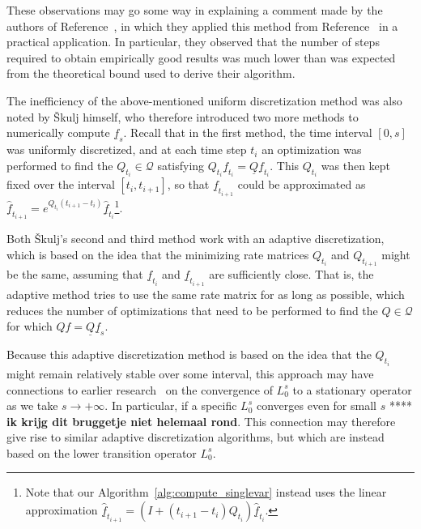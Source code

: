 \documentclass[10pt,a4paper]{paper}
\theoremstyle{definition}
\newcommand{\rateset}{\mathcal{Q}}
\newcommand{\lrate}{\underline{Q}}
\begin{document}
These observations may go some way in explaining a comment made by the authors of Reference~\cite{troffaes2015using}, in which they applied this method from Reference~\cite{Skulj:2015cq} in a practical application. In particular, they observed that the number of steps required to obtain empirically good results was much lower than was expected from the theoretical bound used to derive their algorithm.

The inefficiency of the above-mentioned uniform discretization method was also noted by {\v{S}}kulj himself, who therefore introduced two more methods to numerically compute $\underline{f}_s$. Recall that in the first method, the time interval $[0,s]$ was uniformly discretized, and at each time step $t_i$ an optimization was performed to find the $Q_{t_i}\in\rateset$ satisfying $Q_{t_i}\underline{f}_{t_i}=\lrate \underline{f}_{t_i}$. This $Q_{t_i}$ was then kept fixed over the interval $[t_i,t_{i+1}]$, so that $\underline{f}_{t_{i+1}}$ could be approximated as $\underline{\hat{f}}_{t_{i+1}} = e^{Q_{t_i}(t_{i+1}-t_i)}\underline{\hat{f}}_{t_{i}}$\footnote{Note that our Algorithm~\ref{alg:compute_singlevar} instead uses the linear approximation $\underline{\hat{f}}_{t_{i+1}} = \left(I+(t_{i+1}-t_i)Q_{t_i}\right)\underline{\hat{f}}_{t_{i}}$.}. 

Both {\v{S}}kulj's second and third method work with an adaptive discretization, which is based on the idea that the minimizing rate matrices $Q_{t_i}$ and $Q_{t_{i+1}}$ might be the same, assuming that $\underline{f}_{t_{i}}$ and $\underline{f}_{t_{i+1}}$ are sufficiently close. That is, the adaptive method tries to use the same rate matrix for as long as possible, which reduces the number of optimizations that need to be performed to find the $Q\in\rateset$ for which $Qf=\lrate \underline{f}_{s}$.

Because this adaptive discretization method is based on the idea that the $Q_{t_i}$ might remain relatively stable over some interval, this approach may have connections to earlier research~\cite{DeBock:2016} on the convergence of $L_0^s$ to a stationary operator as we take $s\to+\infty$. In particular, if a specific $L_0^s$ converges even for small $s$ **** {\bf ik krijg dit bruggetje niet helemaal rond}. This connection may therefore give rise to similar adaptive discretization algorithms, but which are instead based on the lower transition operator $L_0^s$.

\end{document}
